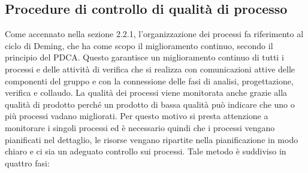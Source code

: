 \subsection{Procedure di controllo di qualità di processo}

Come accennato nella sezione 2.2.1, l'organizzazione dei processi fa riferimento al ciclo di Deming, che ha come scopo il miglioramento continuo, secondo il principio del PDCA. Questo garantisce un miglioramento continuo di tutti i processi e delle attività di verifica che si realizza con comunicazioni attive delle componenti del gruppo e con la connessione delle fasi di analisi, progettazione, verifica e collaudo. La qualità dei processi viene monitorata anche grazie alla qualità di prodotto perché un prodotto di bassa qualità può indicare che uno o più processi vadano migliorati. Per questo motivo si presta attenzione a monitorare i singoli processi ed è necessario quindi che i processi vengano pianificati nel dettaglio, le risorse vengano ripartite nella pianificazione in modo chiaro e ci sia un adeguato controllo sui processi. Tale metodo è suddiviso in quattro fasi:

